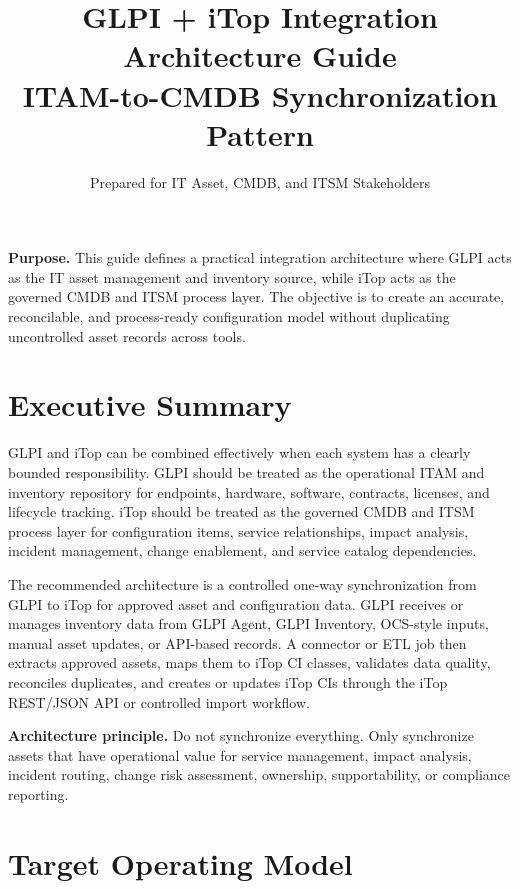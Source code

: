 \documentclass[11pt]{article}
\title{\bfseries\color{Navy} GLPI + iTop Integration Architecture Guide\\\large ITAM-to-CMDB Synchronization Pattern}
\author{Prepared for IT Asset, CMDB, and ITSM Stakeholders}
\date{\docversion}
\begin{document}
\maketitle
\thispagestyle{fancy}

\begin{purposebox}
\textbf{Purpose.} This guide defines a practical integration architecture where GLPI acts as the IT asset management and inventory source, while iTop acts as the governed CMDB and ITSM process layer. The objective is to create an accurate, reconcilable, and process-ready configuration model without duplicating uncontrolled asset records across tools.
\end{purposebox}

\section{Executive Summary}

GLPI and iTop can be combined effectively when each system has a clearly bounded responsibility. GLPI should be treated as the operational ITAM and inventory repository for endpoints, hardware, software, contracts, licenses, and lifecycle tracking. iTop should be treated as the governed CMDB and ITSM process layer for configuration items, service relationships, impact analysis, incident management, change enablement, and service catalog dependencies.

The recommended architecture is a controlled one-way synchronization from GLPI to iTop for approved asset and configuration data. GLPI receives or manages inventory data from GLPI Agent, GLPI Inventory, OCS-style inputs, manual asset updates, or API-based records. A connector or ETL job then extracts approved assets, maps them to iTop CI classes, validates data quality, reconciles duplicates, and creates or updates iTop CIs through the iTop REST/JSON API or controlled import workflow.

\begin{calloutbox}
\textbf{Architecture principle.} Do not synchronize everything. Only synchronize assets that have operational value for service management, impact analysis, incident routing, change risk assessment, ownership, supportability, or compliance reporting.
\end{calloutbox}

\section{Target Operating Model}
\end{document}
